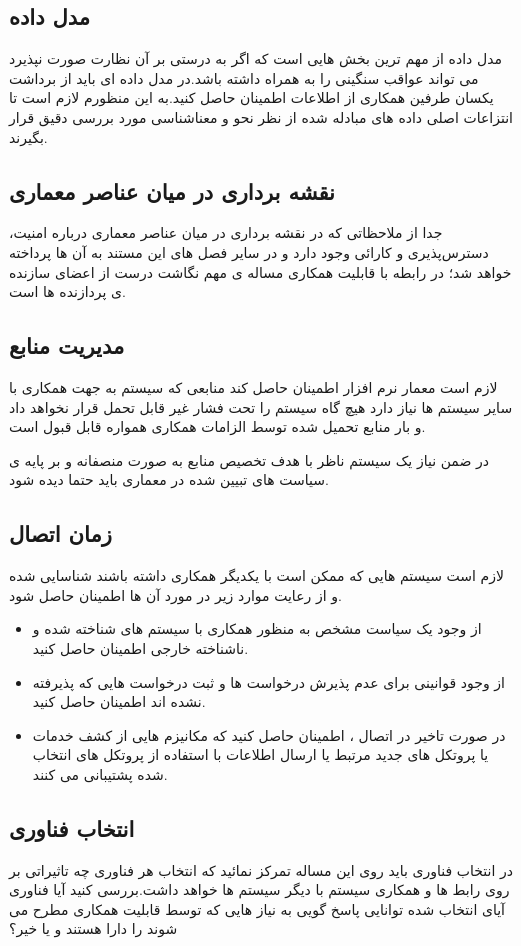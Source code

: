 \subsection{مدل داده}
مدل داده  از مهم ترین بخش هایی است که اگر به درستی بر آن نظارت صورت نپذیرد می تواند عواقب سنگینی را به همراه داشته باشد.در مدل داده ای باید از برداشت یکسان طرفین همکاری از اطلاعات اطمینان حاصل کنید.به این منظورم لازم است تا انتزاعات اصلی داده های مبادله شده از نظر نحو و معناشناسی مورد بررسی دقیق قرار بگیرند.
\subsection{نقشه برداری در میان عناصر معماری}
جدا از ملاحظاتی که در نقشه برداری در میان عناصر معماری درباره امنیت،‌ دسترس‌پذیری و کارائی وجود دارد و در سایر فصل های این مستند به آن ها پرداخته خواهد شد؛ در رابطه با قابلیت همکاری مساله ی مهم نگاشت درست از اعضای سازنده ی پردازنده ها است.
\subsection{مدیریت منابع}
لازم است معمار نرم افزار اطمینان حاصل کند منابعی که سیستم به جهت همکاری با سایر سیستم ها نیاز دارد هیچ گاه سیستم را تحت فشار غیر قابل تحمل قرار نخواهد داد و بار منابع تحمیل شده توسط الزامات همکاری همواره قابل قبول است.

در ضمن نیاز یک سیستم ناظر با هدف تخصیص منابع به صورت منصفانه و بر پایه ی سیاست های تبیین شده در معماری باید حتما دیده شود.
\subsection{زمان اتصال}
لازم است سیستم هایی که ممکن است با یکدیگر همکاری داشته باشند شناسایی شده و از رعایت موارد زیر در مورد آن ها اطمینان حاصل شود.
\begin{itemize}
\item
از وجود یک سیاست مشخص به منظور همکاری با سیستم های شناخته شده و ناشناخته خارجی اطمینان حاصل کنید.
\item
از وجود قوانینی برای عدم پذیرش درخواست ها و ثبت درخواست هایی که پذیرفته نشده اند اطمینان حاصل کنید.
\item
در صورت تاخیر در اتصال ، اطمینان حاصل کنید که مکانیزم هایی از کشف خدمات یا پروتکل های جدید مرتبط یا ارسال اطلاعات با استفاده از پروتکل های انتخاب شده پشتیبانی می کنند.
\end{itemize}
\subsection{انتخاب فناوری}
در انتخاب فناوری باید روی این مساله تمرکز نمائید که انتخاب هر فناوری چه تاثیراتی بر روی رابط ها و همکاری سیستم با دیگر سیستم ها خواهد داشت.بررسی کنید آیا فناوری آیای انتخاب شده توانایی پاسخ گویی به نیاز هایی که توسط قابلیت همکاری مطرح می شوند را دارا هستند و یا خیر؟








